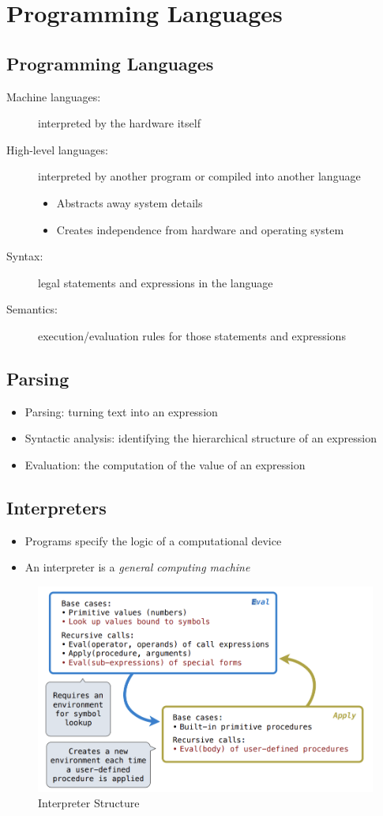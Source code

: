 \chapter{Programming Languages}

\section{Programming Languages}
\begin{description}
    \item [Machine languages:] interpreted by the hardware itself
    \item [High-level languages:] interpreted by another program or compiled into another language
    \begin{itemize}
        \item Abstracts away system details
        \item Creates independence from hardware and operating system
    \end{itemize}
    \item [Syntax:] legal statements and expressions in the language
    \item [Semantics:] execution/evaluation rules for those statements and expressions
\end{description}

\section{Parsing}
\begin{itemize}
    \item Parsing: turning text into an expression
    \item Syntactic analysis: identifying the hierarchical structure of an expression
    \item Evaluation: the computation of the value of an expression
\end{itemize}

\section{Interpreters}
\begin{itemize}
    \item Programs specify the logic of a computational device
    \item An interpreter is a \emph{general computing machine}
\end{itemize}
\medskip
\begin{figure}[H]
\includegraphics[width=0.8\linewidth]{figures/structure_of_an_interpreter.png}
\caption{Interpreter Structure}
\end{figure}